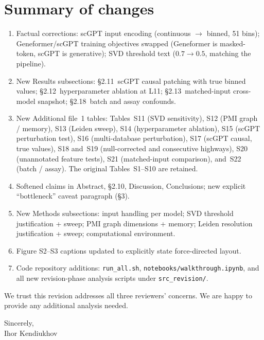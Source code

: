 \documentclass[11pt]{article}
\begin{document}
\bigskip

\section*{Summary of changes}

\begin{enumerate}[leftmargin=1.5em]
\item Factual corrections: scGPT input encoding (continuous $\to$ binned, 51 bins); Geneformer/scGPT training objectives swapped (Geneformer is masked-token, scGPT is generative); SVD threshold text ($0.7 \to 0.5$, matching the pipeline).
\item New Results subsections: \S2.11~scGPT causal patching with true binned values; \S2.12~hyperparameter ablation at L11; \S2.13~matched-input cross-model snapshot; \S2.18~batch and assay confounds.
\item New Additional file~1 tables: Tables~S11 (SVD sensitivity), S12 (PMI graph / memory), S13 (Leiden sweep), S14 (hyperparameter ablation), S15 (scGPT perturbation test), S16 (multi-database perturbation), S17 (scGPT causal, true values), S18 and~S19 (null-corrected and consecutive highways), S20 (unannotated feature tests), S21 (matched-input comparison), and~S22 (batch / assay). The original Tables~S1--S10 are retained.
\item Softened claims in Abstract, \S2.10, Discussion, Conclusions; new explicit ``bottleneck'' caveat paragraph (\S3).
\item New Methods subsections: input handling per model; SVD threshold justification + sweep; PMI graph dimensions + memory; Leiden resolution justification + sweep; computational environment.
\item Figure S2--S3 captions updated to explicitly state force-directed layout.
\item Code repository additions: \texttt{run\_all.sh}, \texttt{notebooks/walkthrough.ipynb}, and all new revision-phase analysis scripts under \texttt{src\_revision/}.
\end{enumerate}

We trust this revision addresses all three reviewers' concerns. We are happy to provide any additional analysis needed.

\vspace{1em}
Sincerely,\\
Ihor Kendiukhov
\end{document}
